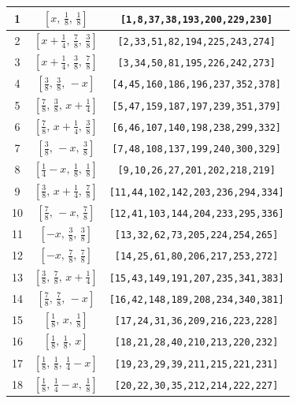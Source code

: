 \documentclass[fleqn,8pt]{jsarticle}
\begin{document}
\begin{longtable}{ccc}
1 & $\left[ x,\, \frac{1}{8},\, \frac{1}{8} \right]$ & {\tt [1,8,37,38,193,200,229,230]} \\ \hline
2 & $\left[ x + \frac{1}{4},\, \frac{7}{8},\, \frac{3}{8} \right]$ & {\tt [2,33,51,82,194,225,243,274]} \\ \hline
3 & $\left[ x + \frac{1}{4},\, \frac{3}{8},\, \frac{7}{8} \right]$ & {\tt [3,34,50,81,195,226,242,273]} \\ \hline
4 & $\left[ \frac{3}{8},\, \frac{3}{8},\, - x \right]$ & {\tt [4,45,160,186,196,237,352,378]} \\ \hline
5 & $\left[ \frac{7}{8},\, \frac{3}{8},\, x + \frac{1}{4} \right]$ & {\tt [5,47,159,187,197,239,351,379]} \\ \hline
6 & $\left[ \frac{7}{8},\, x + \frac{1}{4},\, \frac{3}{8} \right]$ & {\tt [6,46,107,140,198,238,299,332]} \\ \hline
7 & $\left[ \frac{3}{8},\, - x,\, \frac{3}{8} \right]$ & {\tt [7,48,108,137,199,240,300,329]} \\ \hline
8 & $\left[ \frac{1}{4} - x,\, \frac{1}{8},\, \frac{1}{8} \right]$ & {\tt [9,10,26,27,201,202,218,219]} \\ \hline
9 & $\left[ \frac{3}{8},\, x + \frac{1}{4},\, \frac{7}{8} \right]$ & {\tt [11,44,102,142,203,236,294,334]} \\ \hline
10 & $\left[ \frac{7}{8},\, - x,\, \frac{7}{8} \right]$ & {\tt [12,41,103,144,204,233,295,336]} \\ \hline
11 & $\left[ - x,\, \frac{3}{8},\, \frac{3}{8} \right]$ & {\tt [13,32,62,73,205,224,254,265]} \\ \hline
12 & $\left[ - x,\, \frac{7}{8},\, \frac{7}{8} \right]$ & {\tt [14,25,61,80,206,217,253,272]} \\ \hline
13 & $\left[ \frac{3}{8},\, \frac{7}{8},\, x + \frac{1}{4} \right]$ & {\tt [15,43,149,191,207,235,341,383]} \\ \hline
14 & $\left[ \frac{7}{8},\, \frac{7}{8},\, - x \right]$ & {\tt [16,42,148,189,208,234,340,381]} \\ \hline
15 & $\left[ \frac{1}{8},\, x,\, \frac{1}{8} \right]$ & {\tt [17,24,31,36,209,216,223,228]} \\ \hline
16 & $\left[ \frac{1}{8},\, \frac{1}{8},\, x \right]$ & {\tt [18,21,28,40,210,213,220,232]} \\ \hline
17 & $\left[ \frac{1}{8},\, \frac{1}{8},\, \frac{1}{4} - x \right]$ & {\tt [19,23,29,39,211,215,221,231]} \\ \hline
18 & $\left[ \frac{1}{8},\, \frac{1}{4} - x,\, \frac{1}{8} \right]$ & {\tt [20,22,30,35,212,214,222,227]} \\ \hline

\end{longtable}
\end{document}

